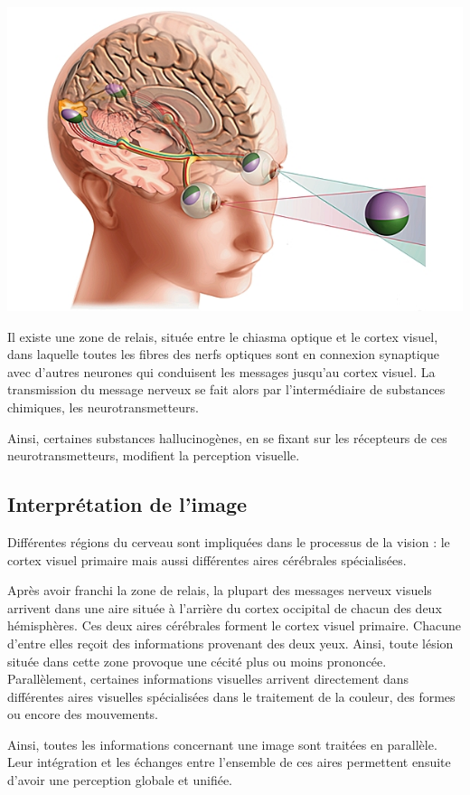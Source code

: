 \documentclass[a4paper, 12pt, onecolumn, openany]{report}
\begin{document}
	\includegraphics[scale=0.7]{deux_yeux.jpg}		
	
	Il existe une zone de relais, située entre le chiasma optique et le cortex visuel, dans laquelle toutes les fibres des nerfs optiques sont en connexion synaptique avec d'autres neurones qui conduisent les messages jusqu'au cortex visuel. La transmission du message nerveux se fait alors par l'intermédiaire de substances chimiques, les neurotransmetteurs.
	
	Ainsi, certaines substances hallucinogènes, en se fixant sur les récepteurs de ces neurotransmetteurs, modifient la perception visuelle.

		\subsection{Interprétation de l'image}
		Différentes régions du cerveau sont impliquées dans le processus de la vision : le cortex visuel primaire mais aussi différentes aires cérébrales spécialisées.
		
	Après avoir franchi la zone de relais, la plupart des messages nerveux visuels arrivent dans une aire située à l'arrière du cortex occipital de chacun des deux hémisphères. Ces deux aires cérébrales forment le cortex visuel primaire. Chacune d'entre elles reçoit des informations provenant des deux yeux. Ainsi, toute lésion située dans cette zone provoque une cécité plus ou moins prononcée. Parallèlement, certaines informations visuelles arrivent directement dans différentes aires visuelles spécialisées dans le traitement de la couleur, des formes ou encore des mouvements.
	
	Ainsi, toutes les informations concernant une image sont traitées en parallèle. Leur intégration et les échanges entre l'ensemble de ces aires permettent ensuite d'avoir une perception globale et unifiée.
	
\end{document}
